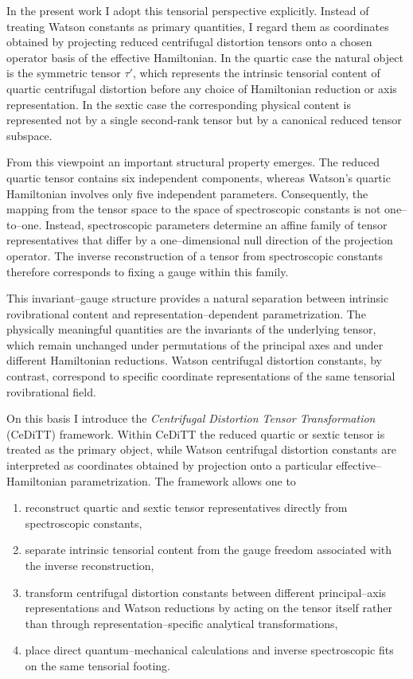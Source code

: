 In the present work I adopt this tensorial perspective explicitly.
Instead of treating Watson constants as primary quantities, I regard
them as coordinates obtained by projecting reduced centrifugal
distortion tensors onto a chosen operator basis of the effective
Hamiltonian. In the quartic case the natural object is the symmetric
tensor $\tau'$, which represents the intrinsic tensorial content of
quartic centrifugal distortion before any choice of Hamiltonian
reduction or axis representation. In the sextic case the corresponding
physical content is represented not by a single second-rank tensor but
by a canonical reduced tensor subspace.

From this viewpoint an important structural property emerges. The
reduced quartic tensor contains six independent components, whereas
Watson's quartic Hamiltonian involves only five independent
parameters. Consequently, the mapping from the tensor space to the
space of spectroscopic constants is not one--to--one. Instead,
spectroscopic parameters determine an affine family of tensor
representatives that differ by a one--dimensional null direction of
the projection operator. The inverse reconstruction of a tensor from
spectroscopic constants therefore corresponds to fixing a gauge within
this family.

This invariant--gauge structure provides a natural separation between
intrinsic rovibrational content and representation--dependent
parametrization. The physically meaningful quantities are the
invariants of the underlying tensor, which remain unchanged under
permutations of the principal axes and under different Hamiltonian
reductions. Watson centrifugal distortion constants, by contrast,
correspond to specific coordinate representations of the same
tensorial rovibrational field.

On this basis I introduce the \emph{Centrifugal Distortion Tensor
Transformation} (CeDiTT) framework. Within CeDiTT the reduced quartic
or sextic tensor is treated as the primary object, while Watson
centrifugal distortion constants are interpreted as coordinates
obtained by projection onto a particular effective--Hamiltonian
parametrization. The framework allows one to
\begin{enumerate}
\item reconstruct quartic and sextic tensor representatives directly
from spectroscopic constants,
\item separate intrinsic tensorial content from the gauge freedom
associated with the inverse reconstruction,
\item transform centrifugal distortion constants between different
principal--axis representations and Watson reductions by acting on the
tensor itself rather than through representation--specific analytical
transformations,
\item place direct quantum--mechanical calculations and inverse
spectroscopic fits on the same tensorial footing.
\end{enumerate}

